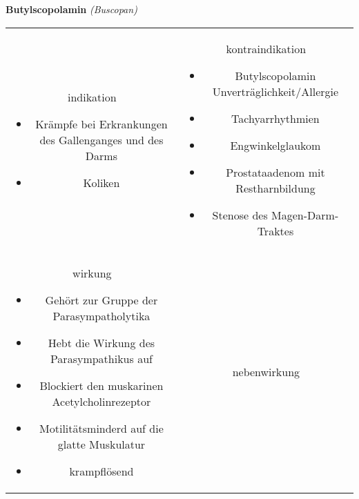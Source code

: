 \begin{frame}{
    \textbf{Butylscopolamin}
    \textit{(Buscopan)}
}
    \begin{tabular}{c c}
        \begin{beamercolorbox}[wd=\boxwidth\textwidth,ht=\boxheight\textheight,sep=1em]{indikation}
            \begin{itemize}
                \item Krämpfe bei Erkrankungen des Gallenganges und des Darms
                \item Koliken	
            \end{itemize}
        \end{beamercolorbox} & 
        \begin{beamercolorbox}[wd=\boxwidth\textwidth,ht=\boxheight\textheight,sep=1em]{kontraindikation}
            \scriptsize
            \begin{itemize}
                \item Butylscopolamin Unverträglichkeit/Allergie
                \item Tachyarrhythmien
                \item Engwinkelglaukom
                \item Prostataadenom mit Restharnbildung
                \item Stenose des Magen-Darm-Traktes
            \end{itemize}
        \end{beamercolorbox} \\
        \begin{beamercolorbox}[wd=\boxwidth\textwidth,ht=\boxheight\textheight,sep=1em]{wirkung}
            \scriptsize
            \begin{itemize}
                \item Gehört zur Gruppe der Parasympatholytika
                \item Hebt die Wirkung des Parasympathikus auf
                \item Blockiert den muskarinen Acetylcholinrezeptor
                \item Motilitätsminderd auf die glatte Muskulatur
                \item krampflösend
            \end{itemize}
        \end{beamercolorbox} & 
        \begin{beamercolorbox}[wd=\boxwidth\textwidth,ht=\boxheight\textheight,sep=1em]{nebenwirkung}
            \tiny

\end{beamercolorbox}
\end{tabular}
\end{frame}
